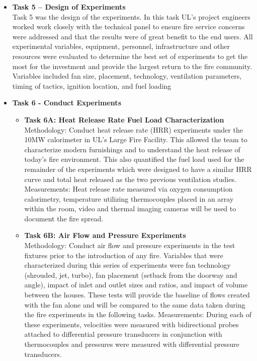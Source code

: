 \documentclass{article}
\begin{document}
\begin{itemize}
	\item \textbf{Task 5 – Design of Experiments} \\
	Task 5 was the design of the experiments. In this task UL’s project engineers worked work closely with the technical panel to ensure fire service concerns were addressed and that the results were of great benefit to the end users. All experimental variables, equipment, personnel, infrastructure and other resources were evaluated to determine the best set of experiments to get the most for the investment and provide the largest return to the fire community. Variables included fan size, placement, technology, ventilation parameters, timing of tactics, ignition location, and fuel loading
	
	\item \textbf{Task 6 - Conduct Experiments} \\
	\begin{itemize}
		\item \textbf{Task 6A: Heat Release Rate Fuel Load Characterization} \\
		Methodology: Conduct heat release rate (HRR) experiments under the 10MW calorimeter in UL’s Large Fire Facility. This allowed the team to characterize modern furnishings and to understand the heat release of today’s fire environment. This also quantified the fuel load used for the remainder of the experiments which were designed to have a similar HRR curve and total heat released as the two previous ventilation studies.
		\vspace{\baselineskip}
		Measurements: Heat release rate measured via oxygen consumption calorimetry, temperature utilizing thermocouples placed in an array within the room, video and thermal imaging cameras will be used to document the fire spread.
		
		\item \textbf{Task 6B: Air Flow and Pressure Experiments} \\
		Methodology: Conduct air flow and pressure experiments in the test fixtures prior to the introduction of any fire. Variables that were characterized during this series of experiments were fan technology (shrouded, jet, turbo), fan placement (setback from the doorway and angle), impact of inlet and outlet sizes and ratios, and impact of volume between the houses. These tests will provide the baseline of flows created with the fan alone and will be compared to the same data taken during the fire experiments in the following tasks.
		\vspace*{\baselineskip}
		Measurements: During each of these experiments, velocities were measured with bidirectional probes attached to differential pressure transducers in conjunction with thermocouples and pressures were measured with differential pressure transducers.
		

\end{itemize}
\end{itemize}
\end{document}
